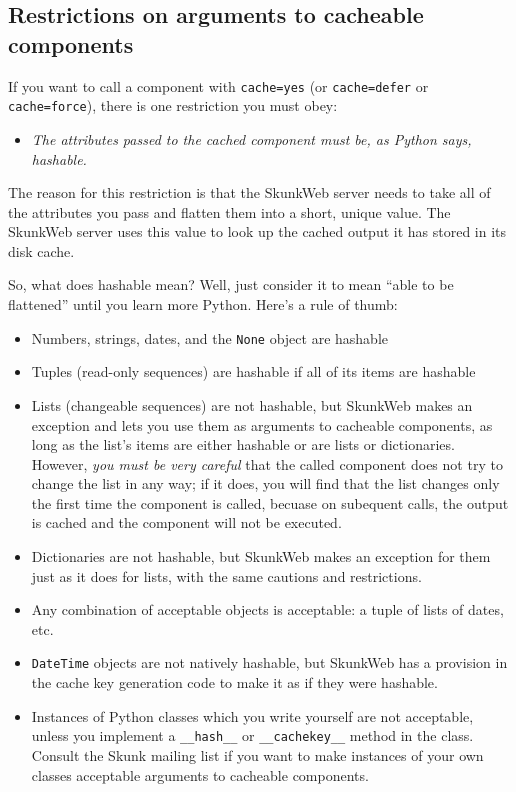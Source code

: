 \documentclass{manual}
\begin{document}
\subsection{Restrictions on arguments to cacheable components}
\label{tagcomponentrestrictions}

If you want to call a component with \texttt{cache=yes} (or
\texttt{cache=defer} or \texttt{cache=force}), there is one
restriction you must obey:

\begin{itemize}
\item \emph{The attributes passed to the cached component must be, 
as Python says, hashable.}
\end{itemize}

The reason for this restriction is that the SkunkWeb server 
needs to take all of the attributes you pass and flatten
them into a short, unique value. The SkunkWeb server uses 
this value to look up the cached output it has stored in 
its disk cache.

So, what does hashable mean? Well, just consider it 
to mean ``able to be flattened'' until you learn more Python. 
Here's a rule of thumb:

\begin{itemize}
\item Numbers, strings, dates, and the \texttt{None} object are hashable

\item Tuples (read-only sequences) are hashable if all of its items
are hashable

\item Lists (changeable sequences) are not hashable, but SkunkWeb makes
an exception and lets you use them as arguments to cacheable 
components, as long as the list's items are either hashable or
are lists or dictionaries. However, \emph{you must be very careful} that the called
component does not try to change the list in any way; if it does,
you will find that the list changes only the first time the component
is called, becuase on subequent calls, the output is cached and the 
component will not be executed.

\item Dictionaries are not hashable, but SkunkWeb makes an exception for them
just as it does for lists, with the same cautions and restrictions.

\item Any combination of acceptable objects is acceptable: 
a tuple of lists of dates, etc.

\item \texttt{DateTime} objects are not natively hashable, but
SkunkWeb has a provision in the cache key generation code to make it
as if they were hashable.

\item Instances of Python classes which you write yourself are not
acceptable, unless you implement a \texttt{__hash__} or \texttt{__cachekey__}
method in the class. Consult the Skunk mailing list if you want
to make instances of your own classes acceptable arguments to 
cacheable components.

\end{itemize}
\end{document}
